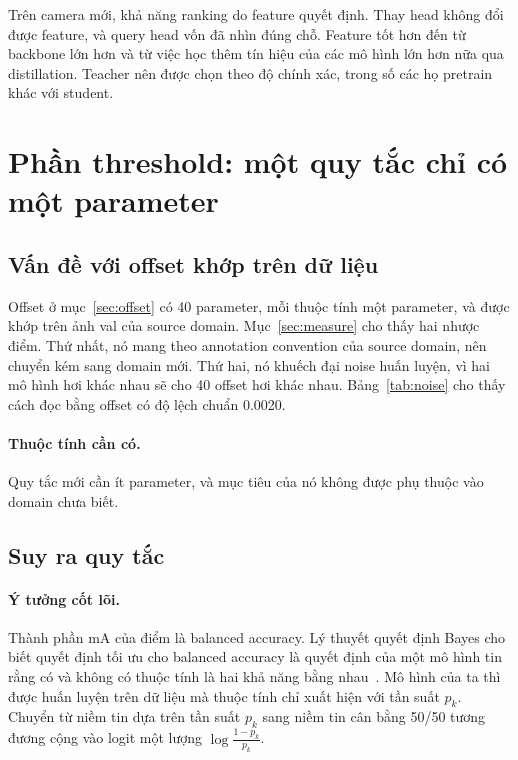 \documentclass[11pt,a4paper]{article}
\begin{document}
\begin{ghichu}
Trên camera mới, khả năng ranking do feature quyết định. Thay head không đổi được feature, và query head vốn đã nhìn đúng chỗ. Feature tốt hơn đến từ backbone lớn hơn và từ việc học thêm tín hiệu của các mô hình lớn hơn nữa qua distillation. Teacher nên được chọn theo độ chính xác, trong số các họ pretrain khác với student.
\end{ghichu}

\section{Phần threshold: một quy tắc chỉ có một parameter}
\label{sec:thr}

\subsection{Vấn đề với offset khớp trên dữ liệu}

Offset ở mục~\ref{sec:offset} có 40 parameter, mỗi thuộc tính một parameter, và được khớp trên ảnh val của source domain. Mục~\ref{sec:measure} cho thấy hai nhược điểm. Thứ nhất, nó mang theo annotation convention của source domain, nên chuyển kém sang domain mới. Thứ hai, nó khuếch đại noise huấn luyện, vì hai mô hình hơi khác nhau sẽ cho 40 offset hơi khác nhau. Bảng~\ref{tab:noise} cho thấy cách đọc bằng offset có độ lệch chuẩn 0.0020.

\paragraph{Thuộc tính cần có.} Quy tắc mới cần ít parameter, và mục tiêu của nó không được phụ thuộc vào domain chưa biết.

\subsection{Suy ra quy tắc}

\paragraph{Ý tưởng cốt lõi.} Thành phần mA của điểm là balanced accuracy. Lý thuyết quyết định Bayes cho biết quyết định tối ưu cho balanced accuracy là quyết định của một mô hình tin rằng có và không có thuộc tính là hai khả năng bằng nhau~\cite{saerens,logitadj}. Mô hình của ta thì được huấn luyện trên dữ liệu mà thuộc tính chỉ xuất hiện với tần suất $p_k$. Chuyển từ niềm tin dựa trên tần suất $p_k$ sang niềm tin cân bằng 50/50 tương đương cộng vào logit một lượng $\log\frac{1-p_k}{p_k}$.
\end{document}
